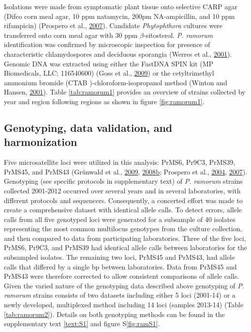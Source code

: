 \documentclass[double,12pt]{beavtex}
\begin{document}
  Isolations were made from symptomatic plant tissue onto selective CARP
  agar (Difco corn meal agar, 10 ppm natamycin, 200pm NA-ampicillin, and
  10 ppm rifampicin) (Prospero et al.,
  \protect\hyperlink{ref-prospero2007population}{2007}). Candidate
  \emph{Phytophthora} cultures were transferred onto corn meal agar with
  30 ppm \(\beta\)-sitosterol. \emph{P. ramorum} identification was
  confirmed by microscopic inspection for presence of characteristic
  chlamydospores and deciduous sporangia (Werres et al.,
  \protect\hyperlink{ref-werres2001phytophthora}{2001}). Genomic DNA was
  extracted using either the FastDNA SPIN kit (MP Biomedicals, LLC;
  116540600) (Goss et al.,
  \protect\hyperlink{ref-goss2009population}{2009}) or the cetyltrimethyl
  ammonium bromide (CTAB )-chloroform-isopropanol method (Winton and
  Hansen, \protect\hyperlink{ref-winton2001molecular}{2001}). Table
  \ref{tab:ramorum1} provides an overview of strains collected by year and
  region following regions as shown in figure \ref{fig:ramorum1}.
  
  \subsection{Genotyping, data validation, and
  harmonization}\label{genotyping-data-validation-and-harmonization}
  
  Five microsatellite loci were utilized in this analysis: PrMS6, Pr9C3,
  PrMS39, PrMS45, and PrMS43 (Grünwald et al.,
  \protect\hyperlink{ref-grunwald2009standardizing}{2009},
  \protect\hyperlink{ref-grunwald2008susceptibility}{2008}\protect\hyperlink{ref-grunwald2008susceptibility}{b};
  Prospero et al., \protect\hyperlink{ref-prospero2004isolation}{2004},
  \protect\hyperlink{ref-prospero2007population}{2007}). Genotyping (see
  specific protocols in supplementary text) of \emph{P. ramorum} strains
  collected 2001-2012 occurred over several years and in several
  laboratories, with different protocols and sequencers. Consequently, a
  concerted effort was made to create a comprehensive dataset with
  identical allele calls. To detect errors, allele calls from all five
  genotyped loci were generated for a subsample of 40 isolates
  representing the most common multilocus genotypes from the culture
  collection, and then compared to data from participating laboratories.
  Three of the five loci, PrMS6, Pr9C3, and PrMS39 had identical allele
  calls between laboratories for the subsampled isolates. The remaining
  two loci, PrMS45 and PrMS43, had allele calls that differed by a single
  bp between laboratories. Data from PrMS45 and PrMS43 were therefore
  corrected to allow consistent comparisons of allele calls. Given the
  varied nature of the genotyping data described above genotyping of
  \emph{P. ramorum} strains consists of two datasets including either 5
  loci (2001-14) or a newly developed, multiplexed method including 14
  loci (samples 2013-14) (Table \ref{tab:ramorum2}). Details on both
  genotyping methods can be found in the supplementary text \ref{text:S1}
  and figure S\ref{fig:ramS1}.
  
\end{document}
